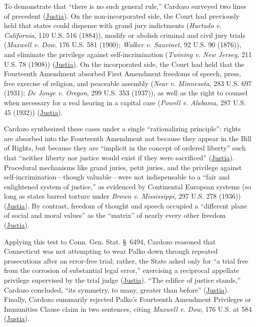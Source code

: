 \documentclass[12pt]{article}
\begin{document}
To demonstrate that ``there is no such general rule,'' Cardozo surveyed two lines of precedent (\href{https://supreme.justia.com/cases/federal/us/302/319/}{Justia}). On the non-incorporated side, the Court had previously held that states could dispense with grand jury indictments (\textit{Hurtado v. California}, 110 U.S. 516 (1884)), modify or abolish criminal and civil jury trials (\textit{Maxwell v. Dow}, 176 U.S. 581 (1900); \textit{Walker v. Sauvinet}, 92 U.S. 90 (1876)), and eliminate the privilege against self-incrimination (\textit{Twining v. New Jersey}, 211 U.S. 78 (1908)) (\href{https://supreme.justia.com/cases/federal/us/302/319/}{Justia}). On the incorporated side, the Court had held that the Fourteenth Amendment absorbed First Amendment freedoms of speech, press, free exercise of religion, and peaceable assembly (\textit{Near v. Minnesota}, 283 U.S. 697 (1931); \textit{De Jonge v. Oregon}, 299 U.S. 353 (1937)), as well as the right to counsel when necessary for a real hearing in a capital case (\textit{Powell v. Alabama}, 287 U.S. 45 (1932)) (\href{https://supreme.justia.com/cases/federal/us/302/319/}{Justia}).

Cardozo synthesized these cases under a single ``rationalizing principle'': rights are absorbed into the Fourteenth Amendment not because they appear in the Bill of Rights, but because they are ``implicit in the concept of ordered liberty'' such that ``neither liberty nor justice would exist if they were sacrificed'' (\href{https://supreme.justia.com/cases/federal/us/302/319/}{Justia}). Procedural mechanisms like grand juries, petit juries, and the privilege against self-incrimination---though valuable---were not indispensable to a ``fair and enlightened system of justice,'' as evidenced by Continental European systems (so long as states barred torture under \textit{Brown v. Mississippi}, 297 U.S. 278 (1936)) (\href{https://supreme.justia.com/cases/federal/us/302/319/}{Justia}). By contrast, freedom of thought and speech occupied a ``different plane of social and moral values'' as the ``matrix'' of nearly every other freedom (\href{https://supreme.justia.com/cases/federal/us/302/319/}{Justia}).

Applying this test to Conn. Gen. Stat. \S~6494, Cardozo reasoned that Connecticut was not attempting to wear Palko down through repeated prosecutions after an error-free trial; rather, the State asked only for ``a trial free from the corrosion of substantial legal error,'' exercising a reciprocal appellate privilege supervised by the trial judge (\href{https://supreme.justia.com/cases/federal/us/302/319/}{Justia}). ``The edifice of justice stands,'' Cardozo concluded, ``its symmetry, to many, greater than before'' (\href{https://supreme.justia.com/cases/federal/us/302/319/}{Justia}). Finally, Cardozo summarily rejected Palko's Fourteenth Amendment Privileges or Immunities Clause claim in two sentences, citing \textit{Maxwell v. Dow}, 176 U.S. at 584 (\href{https://supreme.justia.com/cases/federal/us/302/319/}{Justia}).
\end{document}
